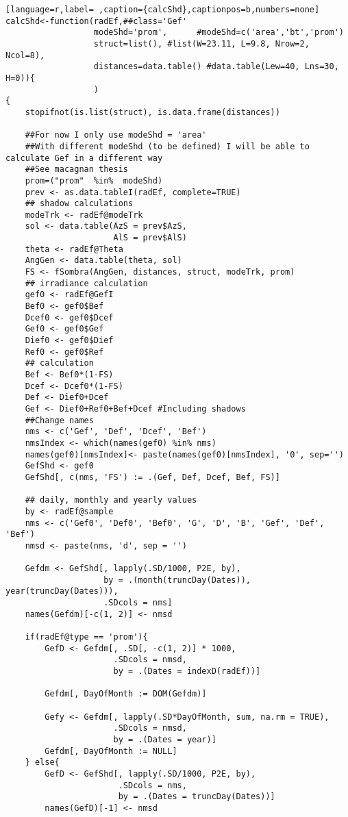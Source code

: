 \begin{lstlisting}[language=r,label= ,caption={calcShd},captionpos=b,numbers=none]
calcShd<-function(radEf,##class='Gef'
                  modeShd='prom',      #modeShd=c('area','bt','prom')
                  struct=list(), #list(W=23.11, L=9.8, Nrow=2, Ncol=8), 
                  distances=data.table() #data.table(Lew=40, Lns=30, H=0)){
                  )
{
    stopifnot(is.list(struct), is.data.frame(distances))

    ##For now I only use modeShd = 'area'
    ##With different modeShd (to be defined) I will be able to calculate Gef in a different way
    ##See macagnan thesis
    prom=("prom"  %in%  modeShd)
    prev <- as.data.tableI(radEf, complete=TRUE)
    ## shadow calculations
    modeTrk <- radEf@modeTrk
    sol <- data.table(AzS = prev$AzS,
                      AlS = prev$AlS)
    theta <- radEf@Theta
    AngGen <- data.table(theta, sol)
    FS <- fSombra(AngGen, distances, struct, modeTrk, prom)
    ## irradiance calculation
    gef0 <- radEf@GefI
    Bef0 <- gef0$Bef
    Dcef0 <- gef0$Dcef
    Gef0 <- gef0$Gef
    Dief0 <- gef0$Dief
    Ref0 <- gef0$Ref
    ## calculation
    Bef <- Bef0*(1-FS)
    Dcef <- Dcef0*(1-FS)
    Def <- Dief0+Dcef
    Gef <- Dief0+Ref0+Bef+Dcef #Including shadows
    ##Change names
    nms <- c('Gef', 'Def', 'Dcef', 'Bef')
    nmsIndex <- which(names(gef0) %in% nms)
    names(gef0)[nmsIndex]<- paste(names(gef0)[nmsIndex], '0', sep='')
    GefShd <- gef0
    GefShd[, c(nms, 'FS') := .(Gef, Def, Dcef, Bef, FS)]

    ## daily, monthly and yearly values
    by <- radEf@sample
    nms <- c('Gef0', 'Def0', 'Bef0', 'G', 'D', 'B', 'Gef', 'Def', 'Bef')
    nmsd <- paste(nms, 'd', sep = '')

    Gefdm <- GefShd[, lapply(.SD/1000, P2E, by),
                    by = .(month(truncDay(Dates)), year(truncDay(Dates))),
                    .SDcols = nms]
    names(Gefdm)[-c(1, 2)] <- nmsd

    if(radEf@type == 'prom'){
        GefD <- Gefdm[, .SD[, -c(1, 2)] * 1000,
                      .SDcols = nmsd,
                      by = .(Dates = indexD(radEf))] 

        Gefdm[, DayOfMonth := DOM(Gefdm)]

        Gefy <- Gefdm[, lapply(.SD*DayOfMonth, sum, na.rm = TRUE),
                      .SDcols = nmsd,
                      by = .(Dates = year)]
        Gefdm[, DayOfMonth := NULL]
    } else{    
        GefD <- GefShd[, lapply(.SD/1000, P2E, by),
                       .SDcols = nms,
                       by = .(Dates = truncDay(Dates))]
        names(GefD)[-1] <- nmsd


\end{lstlisting}
